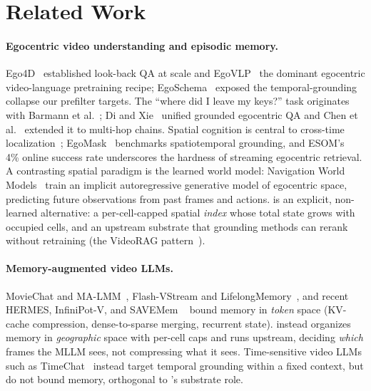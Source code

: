 
\section{Related Work}
\label{sec:related}

\paragraph{Egocentric video understanding and episodic memory.}
Ego4D~\cite{grauman2022ego4d} established look-back QA at scale and
EgoVLP~\cite{lin2022egovlp} the dominant egocentric video-language pretraining
recipe; EgoSchema~\cite{mangalam2023egoschema} exposed the temporal-grounding
collapse our prefilter targets. The ``where did I leave my keys?'' task
originates with Barmann et al.~\cite{barmann2022keys};
Di and Xie~\cite{di2024grounded} unified grounded egocentric QA and Chen et
al.~\cite{chen2025groundedmultihop} extended it to multi-hop chains.
Spatial cognition is central to cross-time localization~\cite{plizzari2025spatial};
EgoMask~\cite{liang2025egomask} benchmarks spatiotemporal grounding, and
ESOM's~\cite{manigrasso2026esom} 4\% online success rate underscores the
hardness of streaming egocentric retrieval. A contrasting spatial paradigm is
the learned world model: Navigation World Models~\cite{bar2025nwm} train an
implicit autoregressive generative model of egocentric space, predicting future
observations from past frames and actions. \psm{} is an explicit, non-learned
alternative: a per-cell-capped spatial \emph{index} whose total state grows with
occupied cells, and an upstream substrate that grounding methods can rerank
without retraining (the VideoRAG pattern~\cite{jeong2025videorag}).

\paragraph{Memory-augmented video LLMs.}
MovieChat and MA-LMM~\cite{song2024moviechat,he2024malmm}, Flash-VStream and
LifelongMemory~\cite{zhang2024flashvstream,wang2024lifelongmemory}, and recent
HERMES, InfiniPot-V, and SAVEMem
~\cite{zhang2026hermes,kim2025infinipotv,wu2026savemem} bound memory in
\emph{token} space (KV-cache
compression, dense-to-sparse merging, recurrent state). \psm{} instead organizes
memory in \emph{geographic} space with per-cell caps and runs upstream, deciding
\emph{which} frames the MLLM sees, not compressing what it sees.
Time-sensitive video LLMs such as TimeChat~\cite{ren2024timechat} instead target
temporal grounding within a fixed context, but do not bound memory, orthogonal
to \psm{}'s substrate role.

